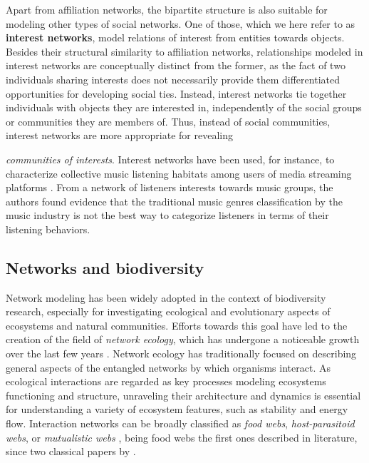 Apart from affiliation networks, the bipartite structure is also suitable for modeling other types of social networks.
One of those, which we here refer to as \textbf{interest networks}, model relations of interest from entities towards objects.
Besides their structural similarity to affiliation networks, relationships modeled in interest networks are conceptually distinct from the former, as the fact of two individuals sharing interests does not necessarily provide them differentiated opportunities for developing social ties.
Instead, interest networks tie together individuals with objects they are interested in, independently of the social groups or communities they are members of. 
Thus, instead of social communities, interest networks are more appropriate for revealing {\textit{communities of interests}.
%
Interest networks have been used, for instance, to characterize collective music listening habitats among users of media streaming platforms \cite{Lambiotte2005}.
From a network of listeners interests towards music groups, the authors found evidence that the traditional music genres classification by the music industry is not the best way to categorize listeners in terms of their listening behaviors.

\subsection{Networks and biodiversity}
Network modeling has been widely adopted in the context of biodiversity research, especially for investigating ecological and evolutionary aspects of ecosystems and natural communities. 
Efforts towards this goal have led to the creation of the field of \textit{network ecology}, which has undergone a noticeable growth over the last few years \cite{Borrett2014}.
Network ecology has traditionally focused on describing general aspects of the entangled networks by which organisms interact.
As ecological interactions are regarded as key processes modeling ecosystems functioning and structure, unraveling their architecture and dynamics is essential for understanding a variety of ecosystem features, such as stability and energy flow.
%
Interaction networks can be broadly classified as \textit{food webs}, \textit{host-parasitoid webs}, or \textit{mutualistic webs} \cite{Ings2009}, being food webs the first ones described in literature, since two classical papers by . 
%

}
